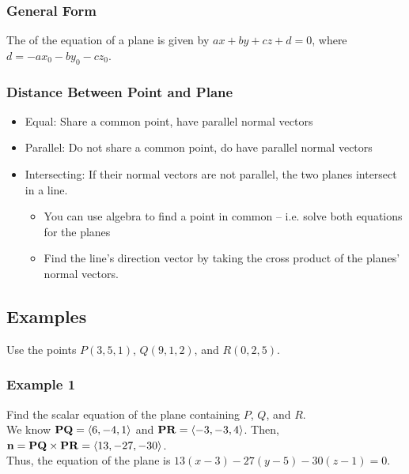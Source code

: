 \subsubsection{General Form}

The  of the equation of a plane is given by \(ax + by + cz + d = 0\), where \(d = -ax_{0} - by_{0} - cz_{0}\).

\subsubsection{Distance Between Point and Plane}

\begin{itemize}
    \item Equal: Share a common point, have parallel normal vectors
    \item Parallel: Do not share a common point, do have parallel normal vectors
    \item Intersecting: If their normal vectors are not parallel, the two planes intersect in a line.
    \begin{itemize}
        \item You can use algebra to find a point in common -- i.e. solve both equations for the planes
        \item Find the line's direction vector by taking the cross product of the planes' normal vectors.
    \end{itemize}
\end{itemize}

\subsection{Examples}

Use the points \(P(3,5,1)\), \(Q(9,1,2)\), and \(R(0,2,5)\).

\subsubsection{Example 1}

Find the scalar equation of the plane containing \(P\), \(Q\), and \(R\). \\

We know \(\mathbf{PQ} = \left\langle 6,-4,1 \right\rangle\) and \(\mathbf{PR} = \left\langle -3,-3,4 \right\rangle\). Then, \(\mathbf{n} = \mathbf{PQ} \times \mathbf{PR} = \left\langle 13,-27,-30 \right\rangle\). \\

Thus, the equation of the plane is \(13(x - 3) - 27(y - 5) - 30(z - 1) = 0\). \\

